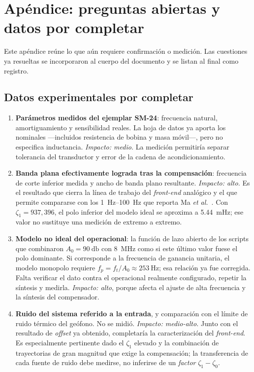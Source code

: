\section{Ap\'endice: preguntas abiertas y datos por completar}
\label{sec:preguntas}

Este ap\'endice re\'une lo que a\'un requiere confirmaci\'on o medici\'on. Las cuestiones ya
resueltas se incorporaron al cuerpo del documento y se listan al final como registro.

\subsection{Datos experimentales por completar}

\begin{enumerate}[itemsep=0.35em]

\item \textbf{Par\'ametros medidos del ejemplar SM-24}: frecuencia natural,
amortiguamiento y sensibilidad reales. La hoja de datos ya aporta los nominales
---incluidos resistencia de bobina y masa m\'ovil---, pero no especifica inductancia.
\emph{Impacto: medio.} La medici\'on permitir\'ia separar tolerancia del transductor y error
de la cadena de acondicionamiento.

\item \textbf{Banda plana efectivamente lograda tras la compensaci\'on}: frecuencia de
corte inferior medida y ancho de banda plano resultante. \emph{Impacto: alto.} Es el
resultado que cierra la l\'inea de trabajo del \emph{front-end} anal\'ogico y el que permite
compararse con los \SIrange{1}{100}{\hertz} que reporta Ma \emph{et al.}~\cite{Ma2023}.
Con $\zeta_1=937{,}396$, el polo inferior del modelo ideal se aproxima a
\SI{5.44}{\milli\hertz}; ese valor no sustituye una medici\'on de extremo a extremo.

\item \textbf{Modelo no ideal del operacional}: la funci\'on de lazo abierto de los scripts
que combinaron
$A_0=\SI{90}{\decibel}$ con \SI{8}{\mega\hertz} como si este \'ultimo valor fuese el
polo dominante. Si corresponde a la frecuencia de ganancia unitaria, el modelo monopolo
requiere $f_p=f_t/A_0\approx\SI{253}{\hertz}$; esa relaci\'on ya fue corregida. Falta
verificar el dato contra el operacional realmente configurado, repetir la s\'intesis y
medirla. \emph{Impacto: alto}, porque afecta el ajuste de alta
frecuencia y la s\'intesis del compensador.

\item \textbf{Ruido del sistema referido a la entrada}, y comparaci\'on con el l\'imite de
ruido t\'ermico del ge\'ofono. No se midi\'o. \emph{Impacto: medio-alto.} Junto con el
resultado de \emph{offset} ya obtenido, completar\'ia la caracterizaci\'on del
\emph{front-end}. Es especialmente pertinente dado el $\zeta_1$ elevado y la combinaci\'on
de trayectorias de gran magnitud que exige la compensaci\'on; la transferencia de cada
fuente de ruido debe medirse, no inferirse de un \emph{factor} \(\zeta_1-\zeta_0\).


\end{enumerate}
